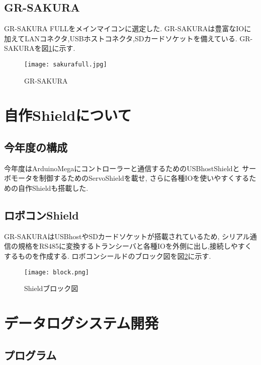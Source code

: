 \documentclass[twocolumn,11pt]{abst}
\begin{document}
\subsection{GR-SAKURA}
GR-SAKURA FULLをメインマイコンに選定した.
GR-SAKURAは豊富なIOに加えてLANコネクタ,USBホストコネクタ,SDカードソケットを備えている.
GR-SAKURAを図\ref{fig:sakura}に示す.\\

\begin{figure}[h]
 \begin{center}
  \texttt{[image: sakurafull.jpg]}
 \end{center}
 \caption{GR-SAKURA}
 \label{fig:sakura}
\end{figure}

\section{自作Shieldについて}
\subsection{今年度の構成}
今年度はArduinoMegaにコントローラーと通信するためのUSBhostShieldと
サーボモータを制御するためのServoShieldを載せ,
さらに各種IOを使いやすくするための自作Shieldも搭載した.

\subsection{ロボコンShield}
GR-SAKURAはUSBhostやSDカードソケットが搭載されているため,
シリアル通信の規格をRS485に変換するトランシーバと各種IOを外側に出し,接続しやすくするものを作成する.
ロボコンシールドのブロック図を図\ref{fig:block}に示す.\\

\begin{figure}[H]
 \begin{center}
  \texttt{[image: block.png]}
 \end{center}
 \caption{Shieldブロック図}
 \label{fig:block}
\end{figure}

\section{データログシステム開発}
\subsection{プログラム}
\end{document}
